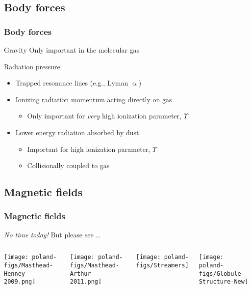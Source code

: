 \documentclass[presentation]{beamer}
\begin{document}
\subsection{Body forces}

\begin{frame}
  \frametitle{Body forces}
  \begin{block}{Gravity}
    Only important in the molecular gas
  \end{block}
  \begin{block}{Radiation pressure}
    \begin{itemize}
    \item Trapped resonance lines (e.g., Lyman \(\upalpha\))
    \item Ionizing radiation momentum acting directly on gas
      \begin{itemize}
      \item Only important for \emph{very} high ionization parameter, \(\Upsilon\)
      \end{itemize}
    \item \alert{Lower energy radiation absorbed by dust}
      \begin{itemize}
      \item Important for high ionization parameter, \(\Upsilon\)
      \item Collisionally coupled to gas
      \end{itemize}
    \end{itemize}
  \end{block}
\end{frame}

\subsection{Magnetic fields}


\begin{frame}
  \frametitle{Magnetic fields}
  \begin{block}{\emph{No time today!} \quad But please see \dots}
    \begin{columns}
      \texttt{[image: poland-figs/Masthead-Henney-2009.png]}\par
      \bigskip 
      \texttt{[image: poland-figs/Masthead-Arthur-2011.png]}\par
      \texttt{[image: poland-figs/Streamers]}\par
      \bigskip 
      \texttt{[image: poland-figs/Globule-Structure-New]}\par
    \end{columns}
  \end{block}
\end{frame}
\end{document}
